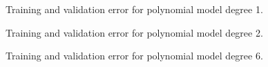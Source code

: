 \documentclass[12pt]{article} %
\begin{document}
\begin{figure}[H]
	\caption{Training and validation error for polynomial model degree 1.}
\end{figure}

\begin{figure}[H]
	\caption{Training and validation error for polynomial model degree 2.}

\end{figure}

\begin{figure}[H]
	\caption{Training and validation error for polynomial model degree 6.}

\end{figure}
\end{document}
